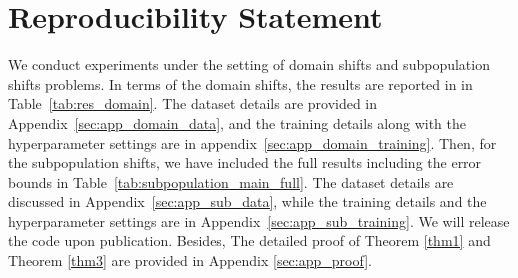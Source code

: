 





\section*{Reproducibility Statement}
We conduct experiments under the setting of domain shifts and subpopulation shifts problems. In terms of the domain shifts, the results are reported in in Table~\ref{tab:res_domain}. The dataset details are provided in Appendix~\ref{sec:app_domain_data}, and the training details along with the hyperparameter settings are in appendix~\ref{sec:app_domain_training}. Then, for the subpopulation shifts, we have included the full results including the error bounds in Table~\ref{tab:subpopulation_main_full}. The dataset details are discussed in Appendix~\ref{sec:app_sub_data}, while the training details and the hyperparameter settings are in Appendix~\ref{sec:app_sub_training}. We will release the code upon publication.
Besides, The detailed proof of Theorem \ref{thm1} and Theorem \ref{thm3} are provided in Appendix \ref{sec:app_proof}. 




